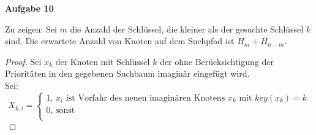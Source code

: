 \documentclass{article}
\begin{document}
{\noindent\bfseries Aufgabe 10}%
\medskip%

\noindent
Zu zeigen: Sei $m$ die Anzahl der Schlüssel, die kleiner als der gesuchte Schlüssel $k$ sind. Die erwartete Anzahl von Knoten auf dem Suchpfad ist $H_{m}+H_{n-m}$. 
\begin{proof}
\noindent

\noindent
Sei $x_{k}$ der Knoten mit Schlüssel $k$ der ohne Berücksichtigung der Prioritäten in den gegebenen Suchbaum imaginär eingefügt wird.\\

\noindent
Sei:\\
  \[
    X_{k,i}=\left\{
                \begin{array}{ll}
                  1\text{, } x_{i} \text{ ist Vorfahr des neuen imaginären Knotens } x_{k} \text{ mit } key(x_{k})=k\\
                  0 \text{, sonst}\\
                

\end{array}\]
\end{proof}
\end{document}
